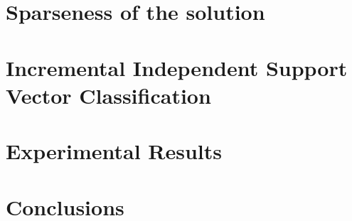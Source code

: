 \documentclass[10pt,twocolumn,letterpaper]{article}
\begin{document}
\section{Sparseness of the solution}
\label{sec:spars}


\section{Incremental Independent Support Vector Classification}
\label{sec:opt}


\section{Experimental Results}
\label{sec:exp}



\section{Conclusions}
\label{sec:concl}




{\small


}
\end{document}
